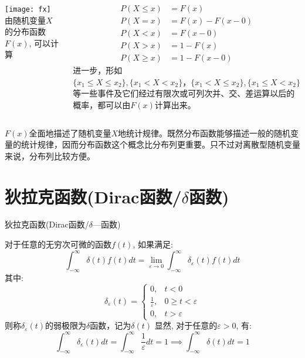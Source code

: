 \begin{frame}
\begin{columns}
\texttt{[image: fx]}
由随机变量$X$的分布函数$F(x)$, 可以计算
\begin{block}{}
\begin{align*}
P(X \le x) &= F(x)\\
P(X = x) &= F(x)-F(x-0) \\
P(X < x) &= F(x-0) \\
P(X > x) &= 1- F(x) \\
P(X \ge x) &= 1-F(x-0)
\end{align*}
进一步，形如$\{x_1\le X\le x_2\},\{x_1< X< x_2\}，\{x_1< X\le x_2\}, \{x_1\le X< x_2\}$等一些事件及它们经过有限次或可列次并、交、差运算以后的概率，都可以由$F(x)$计算出来。
\end{block}
\end{columns}
\begin{block}{}
$F(x)$全面地描述了随机变量$X$地统计规律。既然分布函数能够描述一般的随机变量的统计规律，因而分布函数这个概念比分布列更重要。只不过对离散型随机变量来说，分布列比较方便。
\end{block}
\end{frame}

\section{狄拉克函数(Dirac函数/$\delta$函数)}

\begin{frame}{狄拉克函数(Dirac函数/$\delta$---函数)}
\begin{definition}[$\delta$---函数]
	对于任意的无穷次可微的函数$f(t)$, 如果满足:
	$$\int_{-\infty}^{\infty}\delta (t)f(t)dt=\lim\limits_{\varepsilon\to 0}\int_{-\infty}^{\infty}\delta_{\varepsilon}(t)f(t)dt $$
	其中:
	\[
	\delta_{\varepsilon}(t)=\begin{cases}
	0,&t<0\\
	\frac{1}{\varepsilon}, & 0\ge t<\varepsilon\\
	0, &t>\varepsilon
	\end{cases}
	\]
	则称$\delta_\varepsilon(t)$的弱极限为$\delta$函数，记为$\delta(t)$
	显然, 对于任意的$\varepsilon>0$, 有:
	$$\int_{-\infty}^{\infty}\delta_{\varepsilon}(t)dt=\int_{-\infty}^\infty\frac{1}{\varepsilon}dt=1\implies \int_{-\infty}^\infty\delta(t)dt=1$$
\end{definition}
\end{frame}


